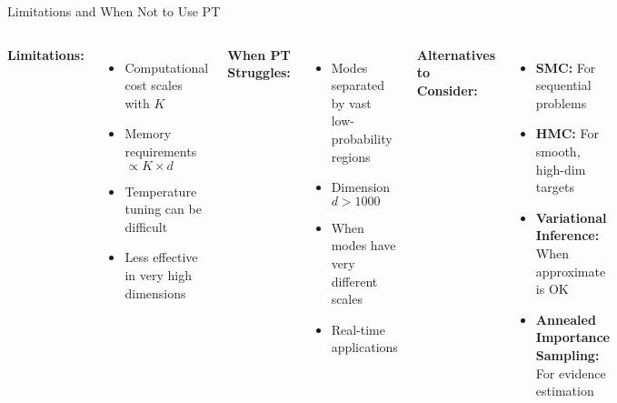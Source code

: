 \documentclass[aspectratio=169]{beamer}
\begin{document}
\begin{frame}{Limitations and When Not to Use PT}
\begin{columns}
\textbf{Limitations:}
\begin{itemize}
    \item Computational cost scales with $K$
    \item Memory requirements $\propto K \times d$
    \item Temperature tuning can be difficult
    \item Less effective in very high dimensions
\end{itemize}

\vspace{0.3cm}
\textbf{When PT Struggles:}
\begin{itemize}
    \item Modes separated by vast low-probability regions
    \item Dimension $d > 1000$
    \item When modes have very different scales
    \item Real-time applications
\end{itemize}

\textbf{Alternatives to Consider:}
\begin{itemize}
    \item \textbf{SMC:} For sequential problems
    \item \textbf{HMC:} For smooth, high-dim targets
    \item \textbf{Variational Inference:} When approximate is OK
    \item \textbf{Annealed Importance Sampling:} For evidence estimation
\end{itemize}

\vspace{0.3cm}
\end{columns}
\end{frame}
\end{document}
